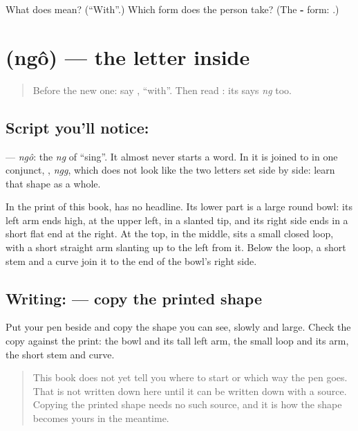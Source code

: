 \begin{tcolorbox}[breakable,colback=teal!4,colframe=teal!35!black,title={Before you move on}]
What does \textbf{} mean? (\textquotedblleft{}With\textquotedblright{}.) Which form does the person take? (The \textbf{-} form: \textbf{ }.)
\end{tcolorbox}
\section[\texorpdfstring{\bn{ঙ} (ngô)}{ঙ (ngô)}]{ (ngô) — the letter inside }

\label{lesson:BN-W275-letter-uma}



\begin{quote}
Before the new one: say \textbf{}, \textquotedblleft{}with\textquotedblright{}. Then read \textbf{}: its \textbf{} says \emph{ng} too.
\end{quote}

\subsection*{Script you'll notice: }
\textbf{} — \emph{ngô}: the \emph{ng} of \textquotedblleft{}sing\textquotedblright{}. It almost never starts a word. In \textbf{} it is joined to \textbf{} in one conjunct, \textbf{}, \emph{ngg}, which does not look like the two letters set side by side: learn that shape as a whole.

In the print of this book, \textbf{} has no headline. Its lower part is a large round bowl: its left arm ends high, at the upper left, in a slanted tip, and its right side ends in a short flat end at the right. At the top, in the middle, sits a small closed loop, with a short straight arm slanting up to the left from it. Below the loop, a short stem and a curve join it to the end of the bowl's right side.

\subsection*{Writing:  — copy the printed shape}
Put your pen beside \textbf{} and copy the shape you can see, slowly and large. Check the copy against the print: the bowl and its tall left arm, the small loop and its arm, the short stem and curve.

\begin{quote}
This book does not yet tell you where to start  or which way the pen goes. That is not written down here until it can be written down with a source. Copying the printed shape needs no such source, and it is how the shape becomes yours in the meantime.
\end{quote}

